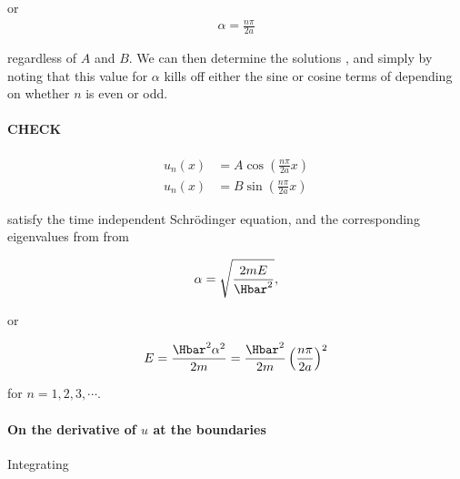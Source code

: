 {or
\begin{equation}\label{eqn:lecture9boundStates:200}
\begin{aligned}
\alpha = \frac{n \pi}{2a}
\end{aligned}
\end{equation}

regardless of \(A\) and \(B\).  We can then determine the solutions , and  simply by noting that this value for \(\alpha\) kills off either the sine or cosine terms of  depending on whether \(n\) is even or odd.

\paragraph{CHECK}

\begin{equation}\label{eqn:lecture9boundStates:220}
\begin{aligned}
u_n(x) &= A \cos \left( \frac{n \pi}{2 a} x \right) \\
u_n(x) &= B \sin \left( \frac{n \pi}{2 a} x \right)
\end{aligned}
\end{equation}

satisfy the time independent Schr\"{o}dinger equation, and the corresponding eigenvalues from from

\begin{equation}\label{eqn:lecture9boundStates:240}
\begin{aligned}
\alpha = \sqrt{\frac{2 m E}{\Hbar^2}},
\end{aligned}
\end{equation}

or

\begin{equation}\label{eqn:lecture9boundStates:260}
\begin{aligned}
E = \frac{\Hbar^2 \alpha^2}{2m} = \frac{\Hbar^2}{2m} \left( \frac{n \pi}{2a} \right)^2
\end{aligned}
\end{equation}

for \(n = 1, 2, 3, \cdots\).

\paragraph{On the derivative of \(u\) at the boundaries}

Integrating

}
